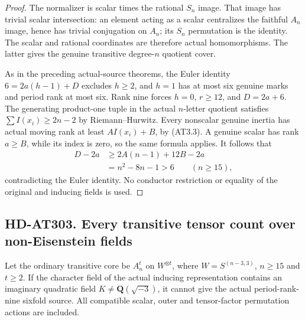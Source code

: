 \begin{proof}
The normalizer is scalar times the rational $S_n$ image.
That image has trivial scalar intersection: an element acting
as a scalar centralizes the faithful $A_n$ image, hence has
trivial conjugation on $A_n$; its $S_n$ permutation is the
identity.  The scalar and rational coordinates are therefore
actual homomorphisms.  The latter gives the genuine transitive
degree-$n$ quotient cover.

As in the preceding actual-source theorems, the Euler identity
$6=2a(h-1)+D$ excludes $h\ge2$, and $h=1$ has at most six
genuine marks and period rank at most six.  Rank nine forces
$h=0$, $r\ge12$, and $D=2a+6$.  The generating product-one
tuple in the actual $n$-letter quotient satisfies
$\sum I(x_i)\ge2n-2$ by Riemann--Hurwitz.
Every nonscalar genuine inertia has actual moving rank at
least $A I(x_i)+B$, by (AT3.3).  A genuine scalar has rank
$a\ge B$, while its index is zero, so the same formula applies.
It follows that
\[
 \begin{split}
 D-2a&\ge2A(n-1)+12B-2a\\
     &=n^2-8n-1>6 \qquad(n\ge15),                        \tag{AT3.11}
 \end{split}
\]
contradicting the Euler identity.  No conductor restriction
or equality of the original and inducing fields is used.
\end{proof}

\subsection*{HD-AT303. Every transitive tensor count over non-Eisenstein fields}

\begin{theorem}[HD-AT303]
Let the ordinary transitive core be $A_n^t$ on $W^{\otimes t}$,
where $W=S^{(n-3,3)}$, $n\ge15$ and $t\ge2$.
If the character field of the actual inducing representation
contains an imaginary quadratic field
$K\ne\mathbf Q(\sqrt{-3})$, it cannot give the actual
period-rank-nine sixfold source.  All compatible scalar,
outer and tensor-factor permutation actions are included.
\end{theorem}

